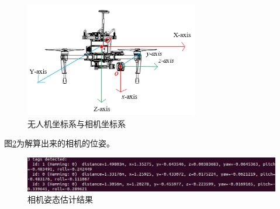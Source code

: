 \begin{figure}[h]
    \centering
    \includegraphics[height=5cm]{figures/无人机坐标系与相机坐标系.png}
    \caption{无人机坐标系与相机坐标系}\label{Axis}
\end{figure}

图\ref{Camera}为解算出来的相机的位姿。

\begin{figure}[htb]
    \centering
    \includegraphics[width=13cm]{figures/相机姿态估计结果.png}
    \caption{相机姿态估计结果}\label{Camera}
\end{figure}
